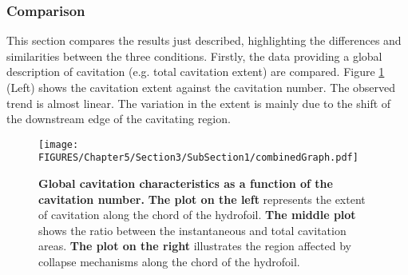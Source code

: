 \subsubsection{Comparison}
\label{subsubsez_comparison}
This section compares the results just described, highlighting the differences and similarities between the three conditions.
Firstly, the data providing a global description of cavitation (e.g. total cavitation extent) are compared. 
Figure \ref{fig:combinedGraph} (Left) shows the cavitation extent against the cavitation number. The observed trend is almost linear. The variation in the extent is mainly due to the shift of the downstream edge of the cavitating region.

\begin{figure}[htbp]
    \centering
    \texttt{[image: FIGURES/Chapter5/Section3/SubSection1/combinedGraph.pdf]}
    \caption{\textbf{Global cavitation characteristics as a function of the cavitation number.} 
    \textbf{The plot on the left} represents the extent of cavitation along the chord of the hydrofoil. \textbf{The middle plot} shows the ratio between the instantaneous and total cavitation areas. \textbf{The plot on the right} illustrates the region affected by collapse mechanisms along the chord of the hydrofoil.}
    \label{fig:combinedGraph}
\end{figure}

